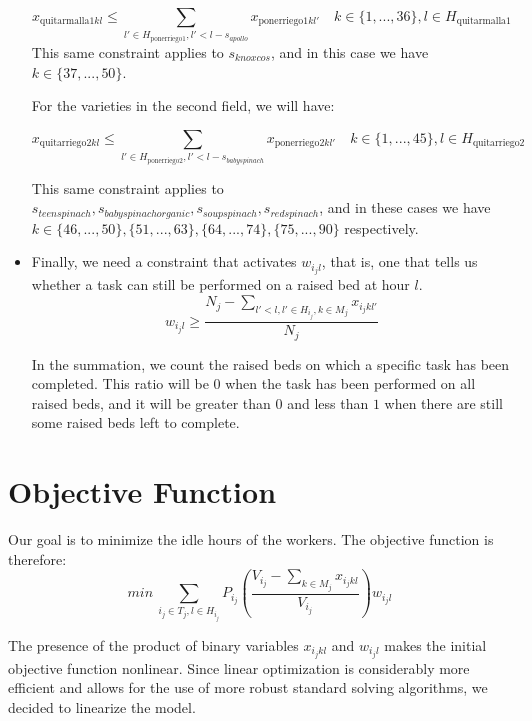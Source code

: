 \begin{itemize}
        \[
	        x_{\text{quitarmalla}1 kl} \leq \sum_{l'\in H_{\text{ponerriego}1}, l'<l-s_{apollo}}x_{\text{ponerriego}1kl'} \quad k\in \{1, ..., 36\}, l\in H_{\text{quitarmalla}1}
        \]
	    This same constraint applies to $s_{knoxcos}$, and in this case we have $k \in \{37, ..., 50\}$.

        For the varieties in the second field, we will have:

        \[
	        x_{\text{quitarriego}2 kl} \leq \sum_{l'\in H_{\text{ponerriego}2}, l'<l-s_{babyspinach}}x_{\text{ponerriego}2kl'} \quad k\in \{1, ..., 45\}, l\in H_{\text{quitarriego}2}
        \]

        This same constraint applies to $s_{teenspinach}, s_{babyspinachorganic}, s_{soupspinach}, s_{redspinach}$, and in these cases we have $k \in \{46, ..., 50\}, \{51, ..., 63\}, \{64, ..., 74\}, \{75, ..., 90\}$ respectively.


        \item Finally, we need a constraint that activates $w_{i_j l}$, that is, one that tells us whether a task can still be performed on a raised bed at hour $l$.
        \[
	        \displaystyle w_{i_j l}\geq \frac{N_j-\sum_{l'<l, l'\in H_{i_j}, k\in M_j}x_{i_j kl'}}{N_j}
        \]
	
        In the summation, we count the raised beds on which a specific task has been completed.  This ratio will be $0$ when the task has been performed on all raised beds, and it will be greater than $0$ and less than $1$ when there are still some raised beds left to complete.
            
\end{itemize}


    \section*{Objective Function}

    Our goal is to minimize the idle hours of the workers. The objective function is therefore:
	\[
	    min\ \sum_{i_j \in T_j, l\in H_{i_j}}P_{i_j}\left(\frac{V_{i_j}-\sum_{k\in M_j}x_{i_j kl}}{V_{i_j}}\right)w_{i_j l}
    \]

    The presence of the product of binary variables $x_{i_j kl}$ and $w_{i_j l}$ makes the initial objective function nonlinear.  
    Since linear optimization is considerably more efficient and allows for the use of more robust standard solving algorithms,  
    we decided to linearize the model.

